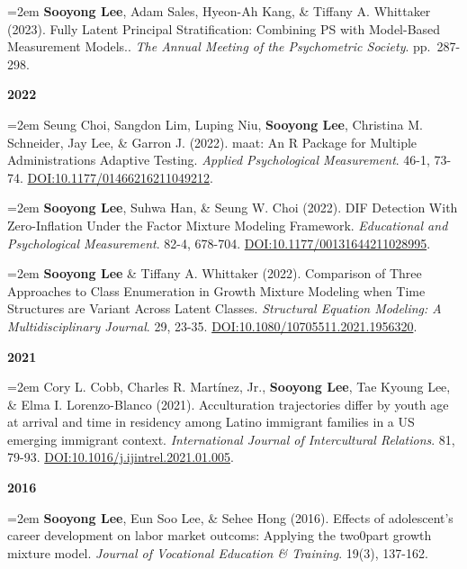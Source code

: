 \documentclass[11pt,letterpaper,]{awesome-me}
\begin{document}
\hangindent=2em  \textbf{Sooyong Lee}, Adam Sales, Hyeon-Ah
Kang, \& Tiffany A. Whittaker (2023). Fully Latent Principal
Stratification: Combining PS with Model-Based Measurement Models..
\emph{The Annual Meeting of the Psychometric Society}. pp.~287-298.

\setlength{\leftskip}{0cm}

\textbf{2022}

\setlength{\leftskip}{0.5cm}

\hangindent=2em  Seung Choi, Sangdon Lim, Luping Niu,
\textbf{Sooyong Lee}, Christina M. Schneider, Jay Lee, \& Garron J.
(2022). maat: An R Package for Multiple Administrations Adaptive
Testing. \emph{Applied Psychological Measurement}. 46-1, 73-74.
\url{DOI:10.1177/01466216211049212}.

\hangindent=2em  \textbf{Sooyong Lee}, Suhwa Han, \& Seung
W. Choi (2022). DIF Detection With Zero-Inflation Under the Factor
Mixture Modeling Framework. \emph{Educational and Psychological
Measurement}. 82-4, 678-704. \url{DOI:10.1177/00131644211028995}.

\hangindent=2em  \textbf{Sooyong Lee} \& Tiffany A.
Whittaker (2022). Comparison of Three Approaches to Class Enumeration in
Growth Mixture Modeling when Time Structures are Variant Across Latent
Classes. \emph{Structural Equation Modeling: A Multidisciplinary
Journal}. 29, 23-35. \url{DOI:10.1080/10705511.2021.1956320}.

\setlength{\leftskip}{0cm}

\textbf{2021}

\setlength{\leftskip}{0.5cm}

\hangindent=2em  Cory L. Cobb, Charles R. Martínez, Jr.,
\textbf{Sooyong Lee}, Tae Kyoung Lee, \& Elma I. Lorenzo-Blanco (2021).
Acculturation trajectories differ by youth age at arrival and time in
residency among Latino immigrant families in a US emerging immigrant
context. \emph{International Journal of Intercultural Relations}. 81,
79-93. \url{DOI:10.1016/j.ijintrel.2021.01.005}.

\setlength{\leftskip}{0cm}

\textbf{2016}

\setlength{\leftskip}{0.5cm}

\hangindent=2em  \textbf{Sooyong Lee}, Eun Soo Lee, \& Sehee
Hong (2016). Effects of adolescent's career development on labor market
outcoms: Applying the two0part growth mixture model. \emph{Journal of
Vocational Education \& Training}. 19(3), 137-162.
\end{document}
